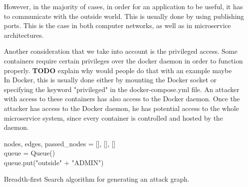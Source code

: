 However, in the majority of cases, in order for an application to be useful, it has to communicate with the outside world. This is usually done by using publishing ports. This is the case in both computer networks, as well as in microservice architectures.

Another consideration that we take into account is the privileged access. Some containers require certain privileges over the docker daemon in order to function properly. \textbf{TODO} explain why would people do that with an example maybe \\In Docker, this is usually done either by mounting the Docker socket or specifying the keyword "privileged" in the docker-compose.yml file. An attacker with access to these containers has also access to the Docker daemon. Once the attacker has access to the Docker daemon, he has potential access to the whole microservice system, since every container is controlled and hosted by the daemon.

\begin{algorithm}
	\SetAlgoLined
	nodes, edges, passed\_nodes = [], [], [] \\
	queue = Queue() \\
	queue.put("outside" + "ADMIN") \\
	
		
		\caption{Breadth-first Search algorithm for generating an attack graph.}
		\label{BFSalgorithm}
	\end{algorithm}
	

